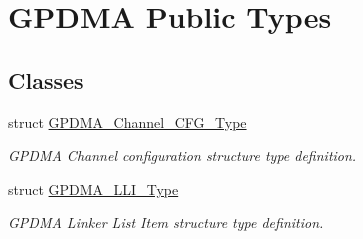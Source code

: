 \hypertarget{group___g_p_d_m_a___public___types}{\section{\-G\-P\-D\-M\-A \-Public \-Types}
\label{group___g_p_d_m_a___public___types}
}
\subsection*{\-Classes}
\begin{DoxyCompactItemize}
\item 
struct \hyperlink{struct_g_p_d_m_a___channel___c_f_g___type}{\-G\-P\-D\-M\-A\-\_\-\-Channel\-\_\-\-C\-F\-G\-\_\-\-Type}
\begin{DoxyCompactList}\small\item\em \-G\-P\-D\-M\-A \-Channel configuration structure type definition. \end{DoxyCompactList}\item 
struct \hyperlink{struct_g_p_d_m_a___l_l_i___type}{\-G\-P\-D\-M\-A\-\_\-\-L\-L\-I\-\_\-\-Type}
\begin{DoxyCompactList}\small\item\em \-G\-P\-D\-M\-A \-Linker \-List \-Item structure type definition. \end{DoxyCompactList}\end{DoxyCompactItemize}

